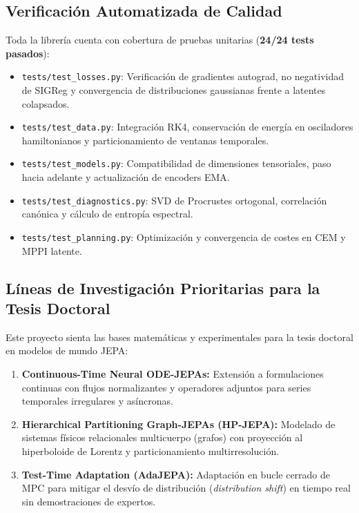\documentclass[10pt,a4paper]{article}
\begin{document}
\subsection{Verificación Automatizada de Calidad}
Toda la librería cuenta con cobertura de pruebas unitarias (\textbf{24/24 tests pasados}):
\begin{itemize}[leftmargin=1.2em]
    \item \texttt{tests/test\_losses.py}: Verificación de gradientes autograd, no negatividad de SIGReg y convergencia de distribuciones gaussianas frente a latentes colapsados.
    \item \texttt{tests/test\_data.py}: Integración RK4, conservación de energía en osciladores hamiltonianos y particionamiento de ventanas temporales.
    \item \texttt{tests/test\_models.py}: Compatibilidad de dimensiones tensoriales, paso hacia adelante y actualización de encoders EMA.
    \item \texttt{tests/test\_diagnostics.py}: SVD de Procrustes ortogonal, correlación canónica y cálculo de entropía espectral.
    \item \texttt{tests/test\_planning.py}: Optimización y convergencia de costes en CEM y MPPI latente.
\end{itemize}

\subsection{Líneas de Investigación Prioritarias para la Tesis Doctoral}
Este proyecto sienta las bases matemáticas y experimentales para la tesis doctoral en modelos de mundo JEPA:
\begin{enumerate}[leftmargin=1.4em]
    \item \textbf{Continuous-Time Neural ODE-JEPAs:} Extensión a formulaciones continuas con flujos normalizantes y operadores adjuntos para series temporales irregulares y asíncronas.
    \item \textbf{Hierarchical Partitioning Graph-JEPAs (HP-JEPA):} Modelado de sistemas físicos relacionales multicuerpo (grafos) con proyección al hiperboloide de Lorentz y particionamiento multirresolución.
    \item \textbf{Test-Time Adaptation (AdaJEPA):} Adaptación en bucle cerrado de MPC para mitigar el desvío de distribución (\textit{distribution shift}) en tiempo real sin demostraciones de expertos.
\end{enumerate}
\end{document}
